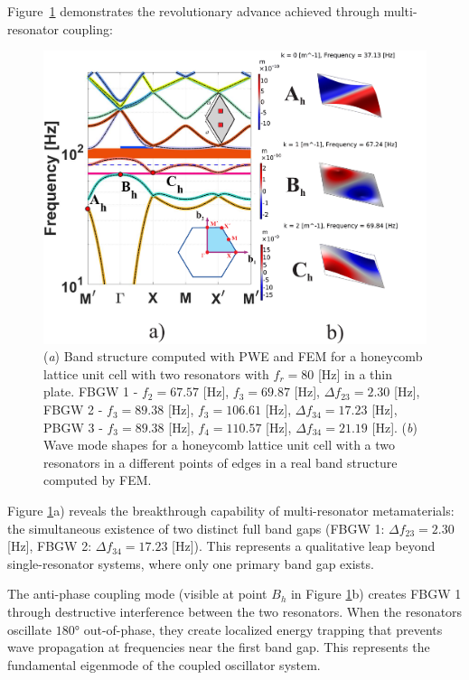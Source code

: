 \documentclass[review,numbers,sort&compress]{elsarticle}
\begin{document}
Figure~\ref{pwe_fem_disp_modal_hex} demonstrates the revolutionary advance achieved through multi-resonator coupling:
\newpage
\begin{figure}[htb]
	\centering
	\includegraphics[width=1\textwidth]{1_4_disp_frf_hex.pdf}
	\caption{(\textit{a}) Band structure computed with PWE and FEM for a honeycomb lattice unit cell with two resonators with $f_r = 80$ [Hz] in a thin plate. FBGW 1 - $f_2 = 67.57$ [Hz], $f_3 = 69.87$ [Hz], $\Delta f_{23} = 2.30 $ [Hz], FBGW 2 - $f_3 = 89.38$ [Hz], $f_3 = 106.61$ [Hz], $\Delta f_{34} = 17.23 $ [Hz], PBGW 3 - $f_3 = 89.38$ [Hz], $f_4 = 110.57$ [Hz], $\Delta f_{34} = 21.19 $ [Hz]. (\textit{b}) Wave mode shapes for a honeycomb lattice unit cell with a two resonators in a different points of edges in a real band structure computed by FEM.}
	\label{pwe_fem_disp_modal_hex}
    \end{figure}

Figure \ref{pwe_fem_disp_modal_hex}a) reveals the breakthrough capability of multi-resonator metamaterials: the simultaneous existence of two distinct full band gaps (FBGW 1: $\Delta f_{23} = 2.30$ [Hz], FBGW 2: $\Delta f_{34} = 17.23$ [Hz]). This represents a qualitative leap beyond single-resonator systems, where only one primary band gap exists.

The anti-phase coupling mode (visible at point $B_h$ in Figure \ref{pwe_fem_disp_modal_hex}b) creates FBGW 1 through destructive interference between the two resonators. When the resonators oscillate $180°$ out-of-phase, they create localized energy trapping that prevents wave propagation at frequencies near the first band gap. This represents the fundamental eigenmode of the coupled oscillator system.
\end{document}
